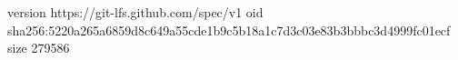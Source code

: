 version https://git-lfs.github.com/spec/v1
oid sha256:5220a265a6859d8c649a55cde1b9c5b18a1c7d3c03e83b3bbbc3d4999fc01ecf
size 279586

